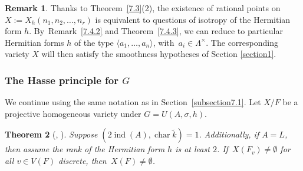 \documentclass[JEP,XML,SOM,Unicode,NoFloatCountersInSection,published]{cedram}
\DeclareMathOperator{\Char}{char}
\DeclareMathOperator{\ind}{ind}
\let\<\langle
\let\>\rangle
\newtheorem{thm}{Theorem}[section]
\theoremstyle{definition}
\newtheorem{rem}[thm]{Remark}
\begin{document}
\begin{rem}\label{evertete?}
Thanks to Theorem~\ref{7.3}(2), the existence of rational points on $X:=X_h(n_1, n_2, \dots, n_r)$ is equivalent to questions of isotropy of the Hermitian form $h$. By~Remark~\ref{7.4.2} and Theorem~\ref{7.4.3}, we can reduce to particular Hermitian forms $h$ of the type $\<a_1, \dots, a_n\>$, with~${a_i \in \Lambda^{\times}}$. The corresponding variety $X$ will then satisfy the smoothness hypotheses of Section \ref{section1}.
\end{rem}

\subsubsection{The Hasse principle for $G$} We continue using the same notation as in Section~\ref{subsection7.1}.
Let $X/F$ be a projective homogeneous variety under $G=\textit{U}(A, \sigma, h)$.

\begin{thm}[{\cite[Th.\,4.4]{wu}, \cite[Th.\,12.3]{parsur}}] \label{7.5} Suppose $(2\ind(A), \Char \widetilde{k})=1$. Addi\-tionally, if $A=L$, then assume the rank of the Hermitian form $h$ is at least $2$. If~$X(F_v) \neq \emptyset$ for all $v \in V(F)$ discrete, then~${X(F) \neq \emptyset}$.
\end{thm}
\end{document}

